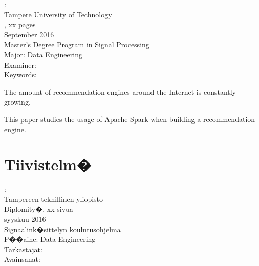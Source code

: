 \documentclass[12pt,a4paper,english
]{tutthesis}
\begin{document}
\begin{spacing}{1.0}
         {\bf \textsf{\MakeUppercase{\@author}}}: \@title\\   %
         \textsf{Tampere University of Technology}\\
         \textsf{\@thesistype, xx pages} \\
         \textsf{September 2016}\\
         \textsf{Master's Degree Program in Signal Processing}\\
         \textsf{Major: Data Engineering}\\
         \textsf{Examiner: \@examiner}\\
         \textsf{Keywords: }\\
\end{spacing}

The amount of recommendation engines around the Internet is constantly growing.

This paper studies the usage of Apache Spark when building a recommendation engine.





\chapter*{Tiivistelm�}         %

\begin{spacing}{1.0}
         {\bf \textsf{\MakeUppercase{\@author}}}: \@titleB\\  %
         \textsf{Tampereen teknillinen yliopisto}\\
         \textsf{Diplomity�, xx sivua}\\ %
         \textsf{syyskuu 2016}\\
         \textsf{Signaalink�sittelyn koulutusohjelma}\\
         \textsf{P��aine: Data Engineering}\\
         \textsf{Tarkastajat: \@examiner}\\
         \textsf{Avainsanat: }\\
\end{spacing}
\end{document}
